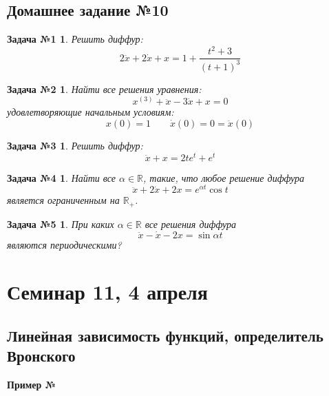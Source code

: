 \documentclass[a4paper,12pt]{article}
\newtheorem*{task1}{Задача №1}
\newtheorem*{task2}{Задача №2}
\newtheorem*{task3}{Задача №3}
\newtheorem*{task4}{Задача №4}
\newtheorem*{task5}{Задача №5}
\newcommand{\R}{\mathbb{R}}
\newcommand{\dx}{\dot{x}}
\newcommand{\ddx}{\ddot{x}}
\begin{document}
\subsection{Домашнее задание №10}


\begin{task1}
	Решить диффур:
	\[2\ddx + 2\dx + x = 1 + \dfrac{t^2 + 3}{(t + 1)^3}\]
\end{task1}
%

\begin{task2}
	Найти все решения уравнения:
	\[x^{(3)} + \ddx - 3\dx + x = 0\]
	удовлетворяющие начальным условиям:
	\[x(0) = 1\qquad \dx(0) = 0 = \ddx(0)\]
\end{task2}
%

\begin{task3}
	Решить диффур:
	\[\ddx + x = 2te^t + e^t\]
\end{task3}
%	

\begin{task4}
	Найти все $\alpha \in \R$, такие, что любое решение диффура
	\[\ddx + 2\dx + 2x = e^{\alpha t}\cos t\] является ограниченным на $\R_+$.
\end{task4}
%

\begin{task5}
	При каких $\alpha \in \R$ все решения диффура
	\[\ddx - \dx - 2x = \sin \alpha t\] являются периодическими?
\end{task5}
%

\newpage
\section{Семинар 11, 4 апреля}

\subsection{Линейная зависимость функций, определитель Вронского}

\textbf{Пример №}
\end{document}
